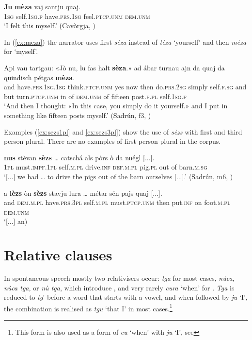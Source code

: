 \ea
\label{ex:jumeza}
\gll \textbf{Ju} \textbf{mèza} vaj santju quaj.\\
\textsc{1sg} self.\textsc{1sg.f} have.\textsc{prs.1sg} feel.\textsc{ptcp.unm} \textsc{dem.unm}\\
\glt`I felt this myself.' (Cavòrgja, \citealt[126]{Büchli1966})
\z

In (\ref{ex:meza}) the narrator uses first \textit{sèza} instead of \textit{tèza} `yourself' and then \textit{mèza} for `myself'.

\ea
\label{ex:meza}
\gll  Api vau tartgau: «Jò nu, lu fas halt \textbf{sèza}.» ad ábar turnau ajn da quaj da quindisch pétgas \textbf{mèza}.\\
and have.\textsc{prs.1sg.1sg} think.\textsc{ptcp.unm} yes now then do.\textsc{prs.2sg} simply self.\textsc{f.sg} and but turn.\textsc{ptcp.unm} in of \textsc{dem.unm} of fifteen post.\textsc{f.pl} self.\textsc{1sg.f} \\
\glt `And then I thought: «In this case, you simply do it yourself.» and I put in something like fifteen posts myself.' (Sadrún, f3, )
\z

Examples (\ref{ex:sezs1pl} and \ref{ex:sezs3pl}) show the use of \textit{sèzs} with first and third person plural. There are no examples of first person plural in the corpus.

\ea
\label{ex:sezs1pl}
\gll    [...] \textbf{nus} stèvan \textbf{sèzs} … catschá als pòrs ò da nuégl [...].\\
{} \textsc{1pl} must.\textsc{impf.1pl} self.\textsc{m.pl} {}  drive.\textsc{inf} \textsc{def.m.pl} pig.\textsc{pl} out of barn.\textsc{m.sg}\\
\glt `[...] we had … to drive the pigs out of the barn ourselves [...].' (Sadrún, m6, )
\z

\ea
\label{ex:sezs3pl}
\gll [...] a \textbf{lèzs} òn \textbf{sèzs} stavju lura … métar sén pajs quaj [...]. \\
{} and \textsc{dem.m.pl} have.\textsc{prs.3pl} self.\textsc{m.pl} must.\textsc{ptcp.unm} then {} put.\textsc{inf} on foot.\textsc{m.pl} \textsc{dem.unm}\\
\glt `[...] an)
\z


\section{Relative clauses}\label{sec:3.7}
In spontaneous speech mostly two relativisers occur: \textit{tga} for most cases, \textit{nùca}, \textit{nùca tga}, or \textit{nù tga}, which introduce , and very rarely \textit{cura} `when' for . \textit{Tga} is reduced to \textit{tg}' before a word that starts with a vowel, and when followed by \textit{ju} `I', the combination is realised as \textit{tgu} `that I' in most cases.\footnote{This form is also used as a  form of \textit{cu} `when' with \textit{ju} `I', see }


